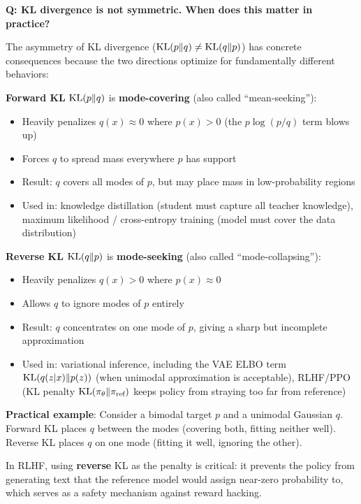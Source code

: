 \begin{interviewq}
\textbf{Q: KL divergence is not symmetric. When does this matter in practice?}

 \quad {} \quad \badgefreq{\freqmed}

\stronganswer
The asymmetry of KL divergence ($\operatorname{KL}(p \| q) \neq \operatorname{KL}(q \| p)$) has concrete consequences because the two directions optimize for fundamentally different behaviors:

\textbf{Forward KL} $\operatorname{KL}(p \| q)$ is \textbf{mode-covering} (also called ``mean-seeking''):
\begin{itemize}
    \item Heavily penalizes $q(x) \approx 0$ where $p(x) > 0$ (the $p \log(p/q)$ term blows up)
    \item Forces $q$ to spread mass everywhere $p$ has support
    \item Result: $q$ covers all modes of $p$, but may place mass in low-probability regions
    \item Used in: knowledge distillation (student must capture all teacher knowledge), maximum likelihood / cross-entropy training (model must cover the data distribution)
\end{itemize}

\textbf{Reverse KL} $\operatorname{KL}(q \| p)$ is \textbf{mode-seeking} (also called ``mode-collapsing''):
\begin{itemize}
    \item Heavily penalizes $q(x) > 0$ where $p(x) \approx 0$
    \item Allows $q$ to ignore modes of $p$ entirely
    \item Result: $q$ concentrates on one mode of $p$, giving a sharp but incomplete approximation
    \item Used in: variational inference, including the VAE ELBO term $\operatorname{KL}(q(z|x) \| p(z))$ (when unimodal approximation is acceptable), RLHF/PPO (KL penalty $\operatorname{KL}(\pi_\theta \| \pi_{\text{ref}})$ keeps policy from straying too far from reference)
\end{itemize}

\textbf{Practical example}: Consider a bimodal target $p$ and a unimodal Gaussian $q$. Forward KL places $q$ between the modes (covering both, fitting neither well). Reverse KL places $q$ on one mode (fitting it well, ignoring the other).

In RLHF, using \textbf{reverse} KL as the penalty is critical: it prevents the policy from generating text that the reference model would assign near-zero probability to, which serves as a safety mechanism against reward hacking.


\end{interviewq}
